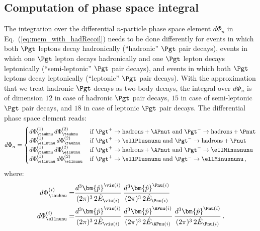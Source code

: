 \subsection{Computation of phase space integral}
\label{sec:mem_PSintegration}

The integration over the differential $n$-particle phase space element
$d\Phi_{n}$ in Eq.~(\ref{eq:mem_with_hadRecoil}) needs to be done differently for
events in which both $\Pgt$ leptons decay hadronically (``hadronic'' $\Pgt$ pair decays),
events in which one $\Pgt$ lepton decays hadronically and one $\Pgt$ lepton decays leptonically (``semi-leptonic'' $\Pgt$ pair decays),
and events in which both $\Pgt$ leptons decay leptonically (``leptonic'' $\Pgt$ pair decays).
With the approximation that we treat hadronic $\Pgt$ decays as
two-body decays, the integral
over $d\Phi_{n}$ is of dimension $12$ in case of hadronic $\Pgt$ pair decays,
$15$ in case of semi-leptonic $\Pgt$ pair decays,
and $18$ in case of leptonic $\Pgt$ pair decays.
The differential phase space element reads:
\begin{equation}
d\Phi_{n}= 
 \begin{cases} 
   d\Phi^{(1)}_{\tauhnu} \, d\Phi^{(2)}_{\tauhnu} \, 
 & \mbox{if } \Pgt^{+} \to \textrm{hadrons} + \APnut \mbox{ and } \Pgt^{-} \to \textrm{hadrons} + \Pnut \\
   d\Phi^{(1)}_{\ellnunu} \, d\Phi^{(2)}_{\tauhnu} \, 
 & \mbox{if } \Pgt^{+} \to \ellPlusnunu \mbox{ and } \Pgt^{-} \to \textrm{hadrons} + \Pnut \\
   d\Phi^{(1)}_{\tauhnu} \, d\Phi^{(2)}_{\ellnunu} \, 
 & \mbox{if } \Pgt^{+} \to \textrm{hadrons} + \APnut \mbox{ and } \Pgt^{-} \to \ellMinusnunu \\
   d\Phi^{(1)}_{\ellnunu} \, d\Phi^{(2)}_{\ellnunu} \, 
 & \mbox{if } \Pgt^{+} \to \ellPlusnunu \mbox{ and } \Pgt^{-} \to \ellMinusnunu \, ,
 \end{cases}
\label{eq:PSintegration_taupair}
\end{equation}
where:
\begin{align}
d\Phi^{(i)}_{\tauhnu} = & \frac{d^{3}\bm{\hat{p}}^{\vis(i)}}{(2\pi)^{3} \, 2
  \hat{E}_{\vis(i)}} \, \frac{d^{3}\bm{\hat{p}}^{\Pnu(i)}}{(2\pi)^{3} \, 2 \hat{E}_{\Pnu(i)}} \nonumber \\
d\Phi^{(i)}_{\ellnunu} = &
\frac{d^{3}\bm{\hat{p}}^{\vis(i)}}{(2\pi)^{3} \, 2 \hat{E}_{\vis(i)}} \, 
\frac{d^{3}\bm{\hat{p}}^{\APnu(i)}}{(2\pi)^{3} \, 2 \hat{E}_{\APnu(i)}} \, 
\frac{d^{3}\bm{\hat{p}}^{\Pnu(i)}}{(2\pi)^{3} \, 2 \hat{E}_{\Pnu(i)}} \, .
\label{eq:PSintegration_onetau}
\end{align}

